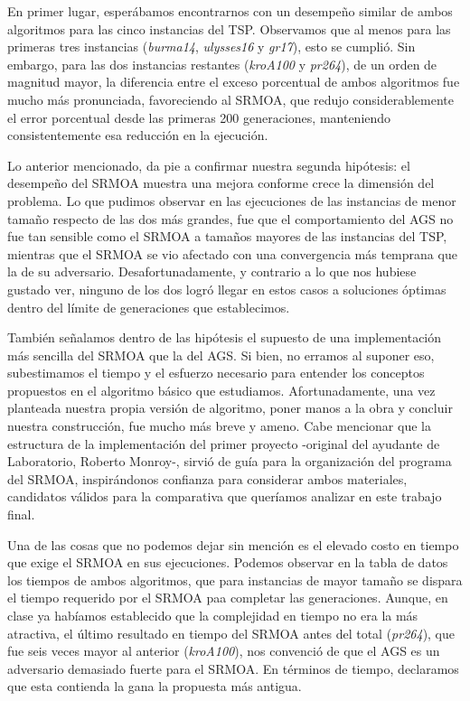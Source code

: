 \documentclass[12pt]{article}
\begin{document}
En primer lugar, esperábamos encontrarnos con un desempeño similar de ambos algoritmos para las cinco instancias del TSP. Observamos que al menos para las primeras tres instancias (\textit{burma14}, \textit{ulysses16} y \textit{gr17}), esto se cumplió. Sin embargo, para las dos instancias restantes (\textit{kroA100} y \textit{pr264}), de un orden de magnitud mayor, la diferencia entre el exceso porcentual de ambos algoritmos fue mucho más pronunciada, favoreciendo al SRMOA, que redujo considerablemente el error porcentual desde las primeras 200 generaciones, manteniendo consistentemente esa reducción en la ejecución.

Lo anterior mencionado, da pie a confirmar nuestra segunda hipótesis: el desempeño del SRMOA muestra una mejora conforme crece la dimensión del problema. Lo que pudimos observar en las ejecuciones de las instancias de menor tamaño respecto de las dos más grandes, fue que el comportamiento del AGS no fue tan sensible como el SRMOA a tamaños mayores de las instancias del TSP, mientras que el SRMOA se vio afectado con una convergencia más temprana que la de su adversario. Desafortunadamente, y contrario a lo que nos hubiese gustado ver, ninguno de los dos logró llegar en estos casos a soluciones óptimas dentro del límite de generaciones que establecimos.

También señalamos dentro de las hipótesis el supuesto de una implementación más sencilla del SRMOA que la del AGS. Si bien, no erramos al suponer eso, subestimamos el tiempo y el esfuerzo necesario para entender los conceptos propuestos en el algoritmo básico que estudiamos. Afortunadamente, una vez planteada nuestra propia versión de algoritmo, poner manos a la obra y concluir nuestra construcción, fue mucho más breve y ameno. Cabe mencionar que la estructura de la implementación del primer proyecto -original del ayudante de Laboratorio, Roberto Monroy-, sirvió de guía para la organización del programa del SRMOA, inspirándonos confianza para considerar ambos materiales, candidatos válidos para la comparativa que queríamos analizar en este trabajo final.

Una de las cosas que no podemos dejar sin mención es el elevado costo en tiempo que exige el SRMOA en sus ejecuciones. Podemos observar en la tabla de datos los tiempos de ambos algoritmos, que para instancias de mayor tamaño se dispara el tiempo requerido por el SRMOA paa completar las generaciones. Aunque, en clase ya habíamos establecido que la complejidad en tiempo no era la más atractiva, el último resultado en tiempo del SRMOA antes del total (\textit{pr264}), que fue seis veces mayor al anterior (\textit{kroA100}), nos convenció de que el AGS es un adversario
demasiado fuerte para el SRMOA. En términos de tiempo, declaramos que esta contienda la gana la propuesta más antigua.
\end{document}
